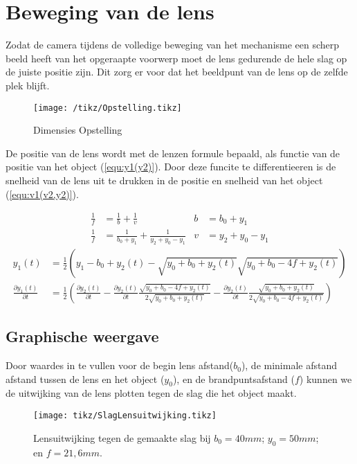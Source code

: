 \section{Beweging van de lens}
Zodat de camera tijdens de volledige beweging van het mechanisme een scherp beeld heeft van het opgeraapte voorwerp moet de lens gedurende de hele slag op de juiste positie zijn. Dit zorg er voor dat het beeldpunt van de lens op de zelfde plek blijft. 
\begin{figure}[h]
\centering
\texttt{[image: /tikz/Opstelling.tikz]}
\caption{Dimensies Opstelling}
\label{fig:Opstelling}
\end{figure}

De positie van de lens wordt met de lenzen formule bepaald, als functie van de positie van het object (\ref{equ:y1(y2)}). Door deze funcite te differentieeren is de snelheid van de lens uit te drukken in de positie en snelheid van het object (\ref{equ:v1(v2,y2)}). 

\begin{align*}
\frac{1}{f}&=\frac{1}{b}+\frac{1}{v}	&	b&=b_{0}+y_{1} \\
\frac{1}{f}&= \frac{1}{b_{0}+y_{1}}+\frac{1}{y_{2}+y_{0}-y_{1}} 	&	v&=y_{2}+y_{0}-y_{1}
\end{align*}
\begin{align}
y_1(t)&=\frac{1}{2}
\left( y_{1}-{b_0} + y_{2}(t) -\sqrt{y_0+b_0+y_2(t)}\sqrt{y_0+b_0-4f+y_2(t)} \right) \label{equ:y1(y2)}\\
\frac{\partial y_1(t)}{\partial t}&=
\frac{1}{2} \left( \frac{\partial y_2(t)}{\partial t} -
\frac{\partial y_2(t)}{\partial t}\frac{\sqrt{y_0+b_0-4f+y_2(t)}}{2\sqrt{y_0+b_0+y_2(t)}} -
\frac{\partial y_2(t)}{\partial t}\frac{\sqrt{y_0+b_0+y_2(t)}}{2\sqrt{y_0+b_0-4f+y_2(t)}} \right) \label{equ:v1(v2,y2)}
\end{align}

\subsection{Graphische weergave}
Door waardes in te vullen voor de begin lens afstand($b_0$), de minimale afstand afstand tussen de lens en het object ($y_0$), en de brandpuntsafstand ($f$) kunnen we de uitwijking van de lens plotten tegen de slag die het object maakt.

\begin{figure}
\centering
	\setlength\figureheight{5cm} 
	\setlength{}
\texttt{[image: tikz/SlagLensuitwijking.tikz]}
\caption[Lensuitwijking tegen de gemaakte slag]{Lensuitwijking tegen de gemaakte slag bij $b_0 = 40mm$; $y_0=50mm$; en $f=21,6mm$.}
\label{fig:SlagLensuitwijking}
\end{figure}

